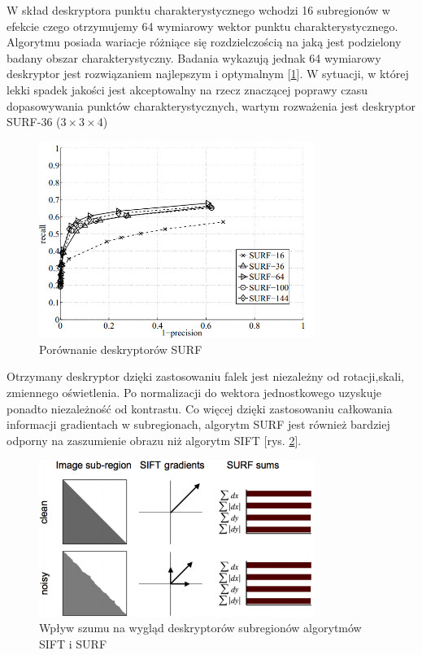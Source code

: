 W skład deskryptora punktu charakterystycznego wchodzi 16 subregionów w efekcie czego otrzymujemy 64 wymiarowy wektor punktu charakterystycznego. Algorytmu posiada wariacje różniące się rozdzielczością na jaką jest podzielony badany obszar charakterystyczny. Badania \cite{HB08} wykazują jednak 64 wymiarowy deskryptor jest rozwiązaniem najlepszym i optymalnym [\ref{fig:surf_bay_compare}]. W sytuacji, w której lekki spadek jakości jest akceptowalny na rzecz znaczącej poprawy czasu dopasowywania punktów charakterystycznych, wartym rozważenia jest deskryptor SURF-36 (\textit{$3\times3\times4$})
\begin{figure}[!htb]
\centering
\includegraphics[width=0.8\textwidth]{pict/02/surf/surf_bay_compare_dim.png}
\caption{Porównanie deskryptorów SURF}
\label{fig:surf_bay_compare}
\end{figure}


Otrzymany deskryptor dzięki zastosowaniu falek jest niezależny od rotacji,skali, zmiennego  oświetlenia. Po normalizacji do wektora jednostkowego uzyskuje ponadto niezależność od kontrastu. Co więcej dzięki zastosowaniu całkowania informacji gradientach w subregionach, algorytm SURF jest również bardziej odporny na zaszumienie obrazu niż algorytm SIFT [rys. \ref{fig:surf_bay_clean_noisy}]. 
\begin{figure}[!htb]
\centering
\includegraphics[width=0.8\textwidth]{pict/02/surf/surf_bay_clean_noisy.png}
\caption{Wpływ szumu na wygląd deskryptorów subregionów algorytmów SIFT i SURF}
\label{fig:surf_bay_clean_noisy}
\end{figure}
\FloatBarrier
\newpage
